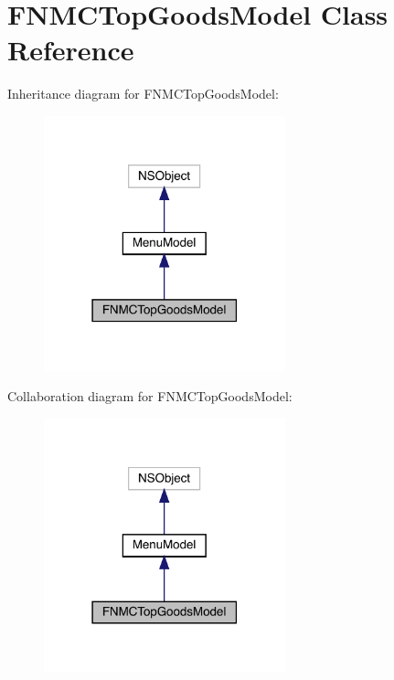 \hypertarget{interface_f_n_m_c_top_goods_model}{}\section{F\+N\+M\+C\+Top\+Goods\+Model Class Reference}
\label{interface_f_n_m_c_top_goods_model}


Inheritance diagram for F\+N\+M\+C\+Top\+Goods\+Model\+:\nopagebreak
\begin{figure}[H]
\begin{center}
\leavevmode
\includegraphics[width=198pt]{interface_f_n_m_c_top_goods_model__inherit__graph}
\end{center}
\end{figure}


Collaboration diagram for F\+N\+M\+C\+Top\+Goods\+Model\+:\nopagebreak
\begin{figure}[H]
\begin{center}
\leavevmode
\includegraphics[width=198pt]{interface_f_n_m_c_top_goods_model__coll__graph}
\end{center}
\end{figure}
